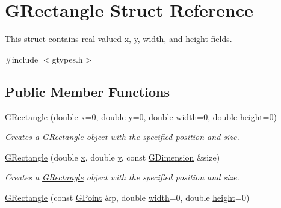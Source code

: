 \hypertarget{structGRectangle}{}\section{G\+Rectangle Struct Reference}
\label{structGRectangle}


This struct contains real-\/valued x, y, width, and height fields.  




{\ttfamily \#include $<$gtypes.\+h$>$}

\subsection*{Public Member Functions}
\begin{DoxyCompactItemize}
\item 
\mbox{\hyperlink{structGRectangle_a3e31a47f01a0e643b572a11b46ce9f69}{G\+Rectangle}} (double \mbox{\hyperlink{structGRectangle_af88b946fb90d5f08b5fb740c70e98c10}{x}}=0, double \mbox{\hyperlink{structGRectangle_ab927965981178aa1fba979a37168db2a}{y}}=0, double \mbox{\hyperlink{structGRectangle_a9df23e056f5d1a0388cd8190431c0e03}{width}}=0, double \mbox{\hyperlink{structGRectangle_a89f6abd564014faeff7cd20c340a9c7d}{height}}=0)
\begin{DoxyCompactList}\small\item\em Creates a {\ttfamily \mbox{\hyperlink{structGRectangle}{G\+Rectangle}}} object with the specified position and size. \end{DoxyCompactList}\item 
\mbox{\hyperlink{structGRectangle_abf6b4d32650748215930e562ffbfb220}{G\+Rectangle}} (double \mbox{\hyperlink{structGRectangle_af88b946fb90d5f08b5fb740c70e98c10}{x}}, double \mbox{\hyperlink{structGRectangle_ab927965981178aa1fba979a37168db2a}{y}}, const \mbox{\hyperlink{structGDimension}{G\+Dimension}} \&size)
\begin{DoxyCompactList}\small\item\em Creates a {\ttfamily \mbox{\hyperlink{structGRectangle}{G\+Rectangle}}} object with the specified position and size. \end{DoxyCompactList}\item 
\mbox{\hyperlink{structGRectangle_a68fa0886a48ee516b8897997c767e504}{G\+Rectangle}} (const \mbox{\hyperlink{structGPoint}{G\+Point}} \&p, double \mbox{\hyperlink{structGRectangle_a9df23e056f5d1a0388cd8190431c0e03}{width}}=0, double \mbox{\hyperlink{structGRectangle_a89f6abd564014faeff7cd20c340a9c7d}{height}}=0)

\end{DoxyCompactItemize}
